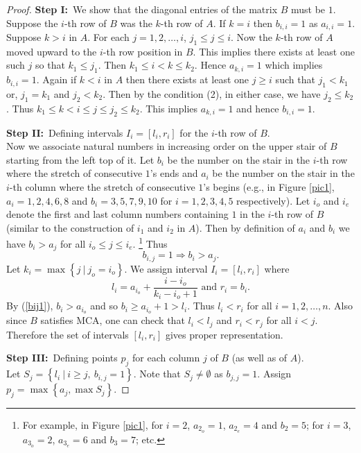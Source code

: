 \documentclass{article}
\theoremstyle{definition}
\numberwithin{equation}{section}
\newcommand{\set}[1]{\left\{#1\right\}}
\newcommand{\Set}[2]{\set{#1\ \vert\ #2}}
\begin{document}
\begin{proof}
\vspace{0.5em}\noindent
{\bf Step I:}\ We show that the diagonal entries of the matrix $B$ must be $1$. \\
Suppose the $i$-th row of $B$ was the $k$-th row of $A$. If $k=i$ then $b_{i,i}=1$ as $a_{i,i}=1$. Suppose $k>i$ in $A$. For each $j=1,2,\ldots, i$, $j_1\leq j\leq i$. Now the $k$-th row of $A$ moved upward to the $i$-th row position in $B$. This implies there exists at least one such $j$ so that $k_1\leq j_1$. Then $k_{1}\leq i<k\leq k_{2}$. Hence $a_{k,i}=1$ which implies $b_{i,i}=1$.  Again if $k<i$ in $A$ then there exists at least one $j\geq i$ such that $j_1<k_1$ or, $j_1=k_1$ and $j_2<k_2$. Then by the condition (2), in either case, we have $j_2\leq k_2$. Thus $k_1\leq k<i\leq j\leq j_2\leq k_2$. This implies $a_{k,i}=1$ and hence $b_{i,i}=1$.

\vspace{0.5em}\noindent 
{\bf Step II:}\ Defining intervals $I_i=[l_i,r_i]$ for the $i$-th row of $B$. \\
Now we associate natural numbers in increasing order on the upper stair of $B$ starting from the left top of it. Let $b_{i}$ be the number on the stair in the $i$-th row where the stretch of consecutive $1$'s ends and $a_i$ be the number on the stair in the $i$-th column where the stretch of consecutive $1$'s begins (e.g., in Figure \ref{pic1}, $a_i=1,2,4,6,8$ and $b_i=3,5,7,9,10$ for $i=1,2,3,4,5$ respectively). Let $i_o$ and $i_e$ denote the first and last column numbers containing $1$ in the $i$-th row of $B$ (similar to the construction of $i_1$ and $i_2$ in $A$). Then by definition of $a_i$ and $b_i$ we have $b_i>a_j$ for all $i_o\leq j\leq i_e$. \footnote{For example, in Figure \ref{pic1}, for $i=2$, $a_{2_o}=1$, $a_{2_e}=4$ and $b_2=5$; for $i=3$, $a_{3_o}=2$, $a_{3_e}=6$ and $b_3=7$; etc.} Thus 
\begin{equation}\label{bij1}
b_{i,j}=1\Longrightarrow b_i>a_j.
\end{equation}
Let $k_i=\max\Set{j}{j_o=i_o}$. We assign interval $I_{i}=[l_{i},r_{i}]$ where 
$$l_{i}=a_{i_o}+\dfrac{i-i_o}{k_i-i_o+1}\text{ and }r_{i}=b_{i}.$$
By (\ref{bij1}), $b_i>a_{i_o}$ and so $b_i\geq a_{i_o}+1>l_i$. Thus $l_i<r_i$ for all $i=1,2,\ldots,n$. Also since $B$ satisfies MCA, one can check that $l_{i}<l_{j}$ and $r_{i}<r_{j}$ for all $i<j$. Therefore the set of intervals $[l_i,r_i]$ gives proper representation. 

\vspace{0.5em}\noindent
{\bf Step III:}\ Defining points $p_{j}$ for each column $j$ of $B$ (as well as of $A$).\\
Let $S_{j}=\Set{l_{i}}{i\geq j,\ b_{i,j}=1}$. Note that $S_{j}\neq \emptyset$ as $b_{j,j}=1$. Assign $p_{j}=\max\set{a_{j}, \max S_{j}}$.


\end{proof}
\end{document}

